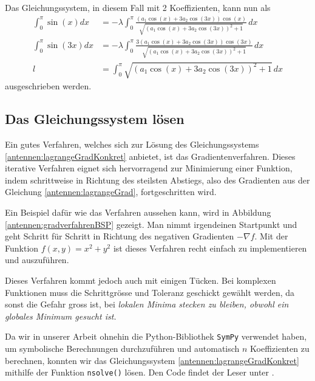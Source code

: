 Das Gleichungssystem, in diesem Fall mit 
2 Koeffizienten, kann nun als
\begin{equation}
	\begin{aligned}
		\int_0^\pi \sin (x) dx
		&=
		-\lambda \int_0^\pi \frac{\left(a_1 \cos (x)+3 a_2 \cos (3 x)\right) 
			\cos (x)}{\sqrt{\left(a_1 \cos (x)+3 a_2 \cos (3 x)\right)^2+1}} \, dx \\
		\int_0^\pi \sin (3 x) dx
		&=
		-\lambda \int_0^\pi \frac{3\left(a_1 \cos (x)+3 a_2 \cos (3 x)\right) 
			\cos (3 x)}{\sqrt{\left(a_1 \cos (x)+3 a_2 \cos (3 x)\right)^2+1}} \, dx \\
		l
		&=
		\int_0^\pi \sqrt{\left(a_1 \cos (x)+3 a_2 \cos (3 x)\right)^2+1} \, dx
	\end{aligned}
	\label{antennen:lagrangeGradKonkret}
\end{equation}
ausgeschrieben werden. 

\subsection{Das Gleichungssystem lösen\label{antennen:glSysSolve}}

Ein gutes Verfahren, welches sich zur Lösung des Gleichungssystems 
\eqref{antennen:lagrangeGradKonkret} anbietet, ist das Gradientenverfahren. Dieses 
iterative Verfahren eignet sich hervorragend zur Minimierung 
einer Funktion, indem schrittweise in Richtung des steilsten Abstiegs,
also des Gradienten aus der Gleichung \eqref{antennen:lagrangeGrad},
fortgeschritten wird. 



Ein Beispiel dafür wie das Verfahren aussehen kann, wird in 
Abbildung \ref{antennen:gradverfahrenBSP} gezeigt. Man nimmt irgendeinen Startpunkt
und geht Schritt für Schritt in Richtung des negativen Gradienten $-\nabla f$.
Mit der Funktion $f(x,y)=x^2+y^2$ ist dieses Verfahren recht einfach zu 
implementieren und auszuführen.

Dieses Verfahren kommt jedoch auch mit einigen Tücken. Bei komplexen Funktionen muss die 
Schrittgrösse und Toleranz geschickt gewählt werden, da sonst die Gefahr gross ist,
bei \em lokalen \em Minima stecken zu bleiben, obwohl ein \em globales \em Minimum gesucht ist.

Da wir in unserer Arbeit ohnehin die Python-Bibliothek \texttt{SymPy} verwendet haben, 
um symbolische Berechnungen durchzuführen und automatisch $n$ Koeffizienten zu berechnen, 
konnten wir das Gleichungssystem \eqref{antennen:lagrangeGradKonkret} mithilfe der Funktion 
\texttt{nsolve()} lösen.
Den Code findet der Leser unter \cite{antennen:codeKoeff}.

